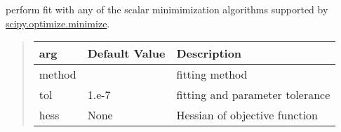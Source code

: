 \documentclass[letterpaper,10pt,english]{sphinxmanual}
\begin{document}

\begin{fulllineitems}
\label{fitting:scalar_minimize}
perform fit with any of the scalar minimimization algorithms supported by
\href{http://docs.scipy.org/doc/scipy/reference/generated/scipy.optimize.minimize.html}{scipy.optimize.minimize}.
\begin{quote}

\begin{tabulary}{\linewidth}{|L|L|L|}
\hline
\textbf{
{\hyperref[fitting:scalar_minimize]{}}
arg
} & \textbf{
Default Value
} & \textbf{
Description
}\\\hline

method
 & 
 & 
fitting method
\\\hline

tol
 & 
1.e-7
 & 
fitting and parameter tolerance
\\\hline

hess
 & 
None
 & 
Hessian of objective function
\\\hline
\end{tabulary}

\end{quote}

\end{fulllineitems}

\end{document}
